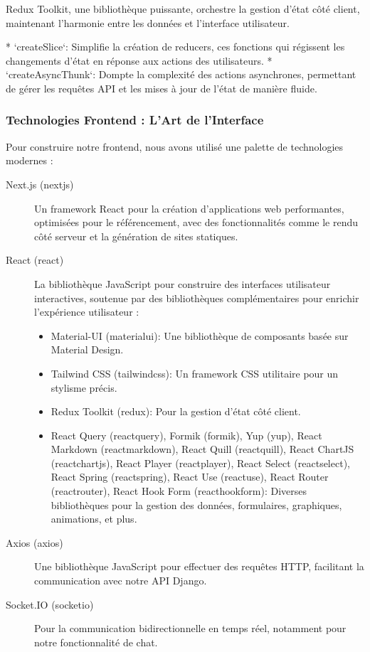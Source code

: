 Redux Toolkit, une bibliothèque puissante, orchestre la gestion d'état côté client, maintenant l'harmonie entre les données et l'interface utilisateur.

* `createSlice`:  Simplifie la création de reducers, ces fonctions qui régissent les changements d'état en réponse aux actions des utilisateurs.
* `createAsyncThunk`:  Dompte la complexité des actions asynchrones, permettant de gérer les requêtes API et les mises à jour de l'état de manière fluide.

\subsubsection{Technologies Frontend : L'Art de l'Interface}

Pour construire notre frontend, nous avons utilisé une palette de technologies modernes :

\begin{description}
    \item[Next.js (\gls{nextjs})] Un framework React pour la création d'applications web performantes, optimisées pour le référencement, avec des fonctionnalités comme le rendu côté serveur et la génération de sites statiques.
    \item[React (\gls{react})] La bibliothèque JavaScript pour construire des interfaces utilisateur interactives, soutenue par des bibliothèques complémentaires pour enrichir l'expérience utilisateur :
    \begin{itemize}
        \item Material-UI (\gls{materialui}): Une bibliothèque de composants basée sur Material Design.
        \item Tailwind CSS (\gls{tailwindcss}): Un framework CSS utilitaire pour un stylisme précis.
        \item Redux Toolkit (\gls{redux}): Pour la gestion d'état côté client.
        \item React Query (\gls{reactquery}), Formik (\gls{formik}), Yup (\gls{yup}), React Markdown (\gls{reactmarkdown}), React Quill (\gls{reactquill}), React ChartJS (\gls{reactchartjs}), React Player (\gls{reactplayer}), React Select (\gls{reactselect}), React Spring (\gls{reactspring}), React Use (\gls{reactuse}), React Router (\gls{reactrouter}), React Hook Form (\gls{reacthookform}): Diverses bibliothèques pour la gestion des données, formulaires, graphiques, animations, et plus.
    \end{itemize}
    \item[Axios (\gls{axios})] Une bibliothèque JavaScript pour effectuer des requêtes HTTP, facilitant la communication avec notre API Django.
    \item[Socket.IO (\gls{socketio})] Pour la communication bidirectionnelle en temps réel, notamment pour notre fonctionnalité de chat.
\end{description}

